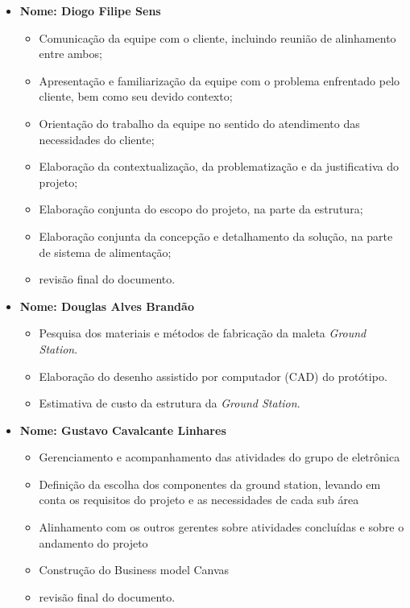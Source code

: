 \begin{itemize}
    \item \textbf{Nome: Diogo Filipe Sens}
    \begin{itemize}
        \item Comunicação da equipe com o cliente, incluindo reunião de alinhamento entre ambos;
        \item Apresentação e familiarização da equipe com o problema enfrentado pelo cliente, bem como seu devido contexto;
        \item Orientação do trabalho da equipe no sentido do atendimento das necessidades do cliente;
        \item Elaboração da contextualização, da problematização e da justificativa do projeto;
        \item Elaboração conjunta do escopo do projeto, na parte da estrutura;
        \item Elaboração conjunta da concepção e detalhamento da solução, na parte de sistema de alimentação;
        \item revisão final do documento.
    \end{itemize}

    
    \item \textbf{Nome: Douglas Alves Brandão}
    \begin{itemize}
        \item Pesquisa dos materiais e métodos de fabricação da maleta \textit{Ground Station}.
        \item Elaboração do desenho assistido por computador (CAD) do protótipo.
        \item Estimativa de custo da estrutura da \textit{Ground Station}.
    \end{itemize}


    \item \textbf{Nome: Gustavo Cavalcante Linhares}
    \begin{itemize}
        \item Gerenciamento e acompanhamento das atividades do grupo de eletrônica
        \item Definição da escolha dos componentes da ground station, levando em conta os requisitos do projeto e as necessidades de cada sub área 
        \item Alinhamento com os outros gerentes sobre atividades concluídas e sobre o andamento do projeto
        \item Construção do Business model Canvas
        \item revisão final do documento.
    \end{itemize}
    

\end{itemize}
